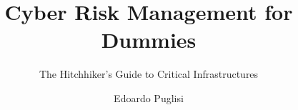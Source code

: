 \documentclass[LaM,noexaminfo,oneside,binding=0.6cm]{sapthesis}
\author{Edoardo Puglisi}
\title{Cyber Risk Management for Dummies}
\subtitle{The Hitchhiker's Guide to Critical Infrastructures}
\begin{document}
\frontmatter
\maketitle
\dedication{} 


\mainmatter



\tableofcontents














\end{document}
